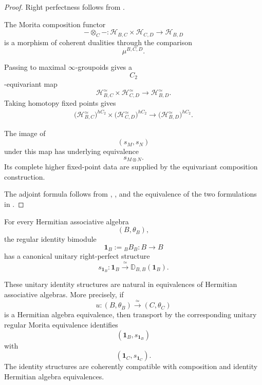 \begin{proof}
Right perfectness follows from
.

The Morita composition functor
\[
    -\otimes_C-
    \colon
    \mathcal H_{B,C}
    \times
    \mathcal H_{C,D}
    \longrightarrow
    \mathcal H_{B,D}
\]
is a morphism of coherent dualities through the comparison
\[
    \mu^{B,C,D}.
\]

Passing to maximal $\infty$-groupoids gives a
\[
    C_2
\]
-equivariant map
\[
    \mathcal H_{B,C}^\simeq
    \times
    \mathcal H_{C,D}^\simeq
    \longrightarrow
    \mathcal H_{B,D}^\simeq.
\]
Taking homotopy fixed points gives
\[
\begin{aligned}
    \bigl(
        \mathcal H_{B,C}^\simeq
    \bigr)^{hC_2}
    \times
    \bigl(
        \mathcal H_{C,D}^\simeq
    \bigr)^{hC_2}
    \longrightarrow
    \bigl(
        \mathcal H_{B,D}^\simeq
    \bigr)^{hC_2}.
\end{aligned}
\]

The image of
\[
    (s_M,s_N)
\]
under this map has underlying equivalence
\[
    s_{M\otimes N}.
\]
Its complete higher fixed-point data are supplied by the equivariant
composition construction.

The adjoint formula follows from
,
,
and the equivalence of the two formulations in
.
\end{proof}

\begin{proposition}
\label{prop:unit-bimodule-unitary}
For every Hermitian associative algebra
\[
    (B,\theta_B),
\]
the regular identity bimodule
\[
    \mathbf 1_B
    :=
    {}_B B_B
    \colon
    B
    \longrightarrow
    B
\]
has a canonical unitary right-perfect structure
\[
    s_{\mathbf 1_B}
    \colon
    \mathbf 1_B
    \xrightarrow{\;\simeq\;}
    \mathbb D_{B,B}(\mathbf 1_B).
\]

These unitary identity structures are natural in equivalences of
Hermitian associative algebras. More precisely, if
\[
    u
    \colon
    (B,\theta_B)
    \xrightarrow{\;\simeq\;}
    (C,\theta_C)
\]
is a Hermitian algebra equivalence, then transport by the corresponding
unitary regular Morita equivalence identifies
\[
    (\mathbf 1_B,s_{\mathbf 1_B})
\]
with
\[
    (\mathbf 1_C,s_{\mathbf 1_C}).
\]
The identity structures are coherently compatible with composition and
identity Hermitian algebra equivalences.
\end{proposition}

